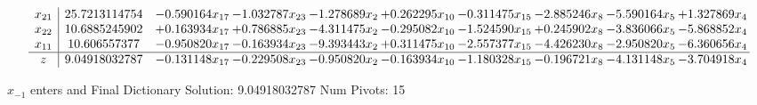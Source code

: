 \documentclass[10pt]{article}
\begin{document}
\[\begin{array}{c| c c@{\hskip 2pt} c@{\hskip 2pt} c@{\hskip 2pt} c@{\hskip 2pt} c@{\hskip 2pt} c@{\hskip 2pt} c@{\hskip 2pt} c@{\hskip 2pt} }
 x_{21}   &  25.7213114754 & -0.590164 x_{17} & -1.032787 x_{23} & -1.278689 x_{2} & + 0.262295 x_{10} & -0.311475 x_{15} & -2.885246 x_{8} & -5.590164 x_{5} & + 1.327869 x_{4}\\
 x_{22}   &  10.6885245902 & + 0.163934 x_{17} & + 0.786885 x_{23} & -4.311475 x_{2} & -0.295082 x_{10} & -1.524590 x_{15} & + 0.245902 x_{8} & -3.836066 x_{5} & -5.868852 x_{4}\\
 x_{11}   &  10.606557377 & -0.950820 x_{17} & -0.163934 x_{23} & -9.393443 x_{2} & + 0.311475 x_{10} & -2.557377 x_{15} & -4.426230 x_{8} & -2.950820 x_{5} & -6.360656 x_{4}\\
\hline
z    &  9.04918032787 & -0.131148 x_{17} & -0.229508 x_{23} & -0.950820 x_{2} & -0.163934 x_{10} & -1.180328 x_{15} & -0.196721 x_{8} & -4.131148 x_{5} & -3.704918 x_{4}\\
\end{array}\]


 $ x_{-1} $ enters and Final Dictionary
Solution:  9.04918032787
Num Pivots:  15
\end{document}
